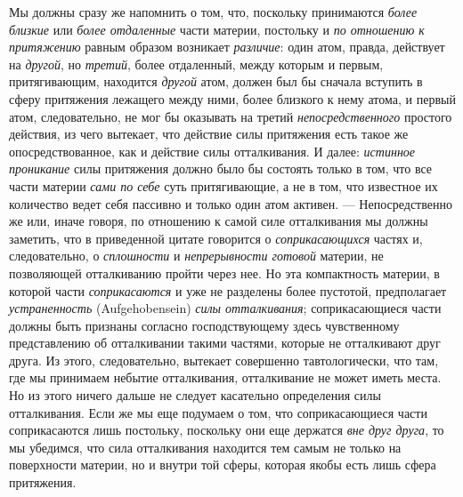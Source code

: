 Мы должны сразу же напомнить о том, что, поскольку принимаются
{\em более близкие} или {\em более
отдаленные} части материи, постольку и {\em по
отношению к притяжению} равным образом возникает
{\em различие}: один атом, правда, действует на
{\em другой}, но {\em третий},
более отдаленный, между которым и первым, притягивающим, находится
{\em другой} атом, должен был бы сначала вступить в
сферу притяжения лежащего между ними, более близкого к нему атома, и первый
атом, следовательно, не мог бы оказывать на третий
{\em непосредственного} простого действия, из чего
вытекает, что действие силы притяжения есть такое же опосредствованное, как
и действие силы отталкивания. И далее: {\em истинное
проникание} силы притяжения должно было бы состоять только в том, что все
части материи {\em сами по себе} суть притягивающие, а
не в том, что известное их количество ведет себя пассивно и только один
атом активен. — Непосредственно же или, иначе говоря, по отношению к самой
силе отталкивания мы должны заметить, что в приведенной цитате говорится о
{\em соприкасающихся} частях и, следовательно, о
{\em сплошности} и
{\em непрерывности готовой} материи, не позволяющей
отталкиванию пройти через нее. Но эта компактность материи, в которой части
{\em соприкасаются} и уже не разделены более пустотой,
предполагает {\em устраненность} (Aufgehobensein)
{\em силы отталкивания}; соприкасающиеся части должны
быть признаны согласно господствующему здесь чувственному представлению об
отталкивании такими частями, которые не отталкивают друг друга. Из этого,
следовательно, вытекает совершенно тавтологически, что там, где мы
принимаем небытие отталкивания, отталкивание не может иметь места. Но из
этого ничего дальше не следует касательно определения силы отталкивания.
Если же мы еще подумаем о том, что соприкасающиеся части соприкасаются лишь
постольку, поскольку они еще держатся {\em вне друг
друга}, то мы убедимся, что сила отталкивания находится тем самым не только
на поверхности материи, но и внутри той сферы, которая якобы есть лишь
сфера притяжения.


